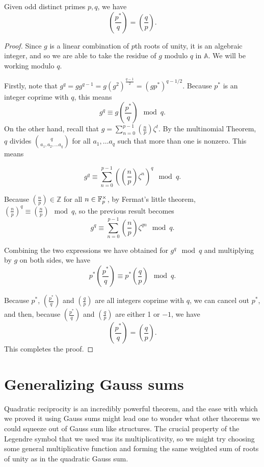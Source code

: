 \documentclass[utf8, letterpaper]{article}
\begin{document}
\begin{theorem}  Given odd distinct primes $p, q$, we have
\[
        \left(\frac{p^*}{q}\right) = \left(\frac{q}{p}\right)
.\] 

\end{theorem}
\begin{proof} Since $g$ is a linear combination of $p$th roots of unity, it is an algebraic integer, and so we are able to take the residue of $g$ modulo $q$ in $\mathbb{A}$. We will be working modulo $q$.

Firstly, note that $g^q=gg^{q-1}=g(g^2)^{\frac{q-1}{2}}=(gp^*)^{q-1/2}$. Because $p^*$ is an integer coprime with $q$, this means
\[
       g^q\equiv g\left(\frac{p^*}{q}\right) \mod q
.\] 
On the other hand, recall that $g=\sum^{p-1}_{n=0}\left(\frac{n}{p}\right)\zeta^t$. By the multinomial Theorem, $q$ divides $\binom{q}{a_1, a_2, \ldots a_q}$ for all $a_1, \ldots a_q$ such that more than one is nonzero. This means
    
    \[
       g^q\equiv \sum_{n=0}^{p-1} \left(\left(\frac{n}{p}\right)\zeta^n\right)^q \mod{q}
    .\] 
    
Because $\left(\frac{n}{p}\right)\in \mathbb{Z}$ for all $n\in \mathbb{F}_p^{\times}$, by Fermat's little theorem, $\left(\frac{n}{p}\right)^q\equiv \left(\frac{n}{p}\right)\mod{q}$, so the previous result becomes 
 \[
   g^q\equiv \sum^{p-1}_{n=0} \left(\frac{n}{p}\right)\zeta^{qn} \mod{q}
.\] 

Combining the two expressions we have obtained for $g^q\mod{q}$ and multiplying by $g$ on both sides, we have 
\[
   p^*\left(\frac{p^*}{q}\right)\equiv p^*\left (\frac{q}{p}\right) \mod{q}
.\] 
    
Because $p^*$, $\left(\frac{p^*}{q}\right)$ and $\left(\frac{q}{p}\right)$ are all integers coprime with $q$, we can cancel out $p^*$, and then, because $\left(\frac{p^*}{q}\right)$ and $\left(\frac{q}{p}\right)$ are either 1 or $-1$, we have \[\left(\frac{p^*}{q}\right)=\left(\frac{q}{p}\right).\]
This completes the proof.
\end{proof}

\section{Generalizing Gauss sums}

Quadratic reciprocity is an incredibly powerful theorem, and the ease with which we proved it using Gauss sums might lead one to wonder what other theorems we could squeeze out of Gauss sum like structures. The crucial property of the Legendre symbol that we used was its multiplicativity, so we might try choosing some general multiplicative function and forming the same weighted sum of roots of unity as in the quadratic Gauss sum.
\end{document}

